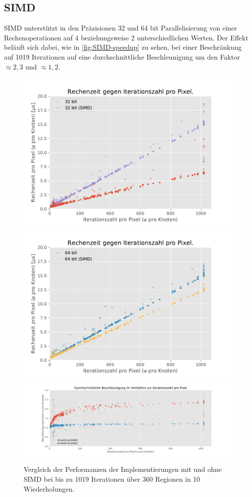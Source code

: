 \subsection{SIMD}




SIMD unterstützt in den Präzisionen 32 und 64 bit Parallelisierung von einer Rechenoperationen auf
4 beziehungsweise 2 unterschiedlichen Werten. Der Effekt beläuft sich dabei, wie in \autoref{fig:SIMD-speedup} zu sehen,
bei einer Beschränkung auf 1019 Iterationen auf eine durchschnittliche Beschleunigung um den Faktor $\approx2,3$ und $\approx1,2$.

\begin{figure}
	\centering
	\includegraphics[width=0.45\linewidth]{img/Evaluation/simd/itvscmp32.pdf}
	\includegraphics[width=0.45\linewidth]{img/Evaluation/simd/itvscmp64.pdf}
	\includegraphics[width=\linewidth]{img/Evaluation/simd/speedup.pdf}
	\caption{Vergleich der Performanzen der Implementierungen mit und ohne SIMD bei bis zu 1019 Iterationen über 360 Regionen in 10 Wiederholungen.}
	\label{fig:SIMD-speedup}
	\label{fig:SIMD-speedup-vs-comptime}
\end{figure}

